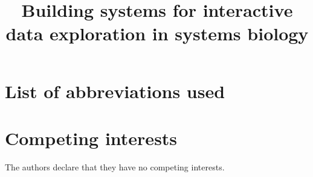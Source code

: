 \documentclass[twocolumn]{bmcart}%
\begin{document}
\begin{frontmatter}
\begin{fmbox}

\title{Building systems for interactive data exploration in systems biology}

 

\begin{artnotes}
\end{artnotes}
\end{fmbox}%
 
\end{frontmatter}
 

\begin{backmatter}
\section*{List of abbreviations used}
\section*{Competing interests}
The authors declare that they have no competing interests.
\end{backmatter}
\end{document}
